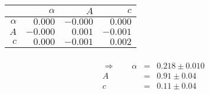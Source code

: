  \begin{tabular}{|r|r|r|r|}
 \hline 
\tabcolor&\tabcolor$\alpha$&\tabcolor$A$&\tabcolor$c$\\ \hline 
 \tabcolor$\alpha$&$0.000$ &$-0.000$ &$0.000$ \\ \hline
\tabcolor$A$&$-0.000$ &$0.001$ &$-0.001$ \\ \hline
\tabcolor$c$&$0.000$ &$-0.001$ &$0.002$ \\ \hline
\end{tabular}
\begin{align}\\ \Rightarrow \qquad
    \alpha &=& 0.218 \pm 0.010 \\
    A &=& 0.91 \pm 0.04 \\
    c &=& 0.11 \pm 0.04 
\end{align}

